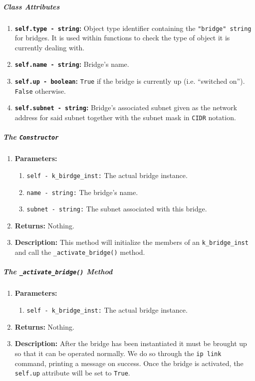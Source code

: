         \subparagraph{Class Attributes}
            \begin{enumerate}
                \item \textbf{\texttt{self.type - string}:} Object type identifier containing the \texttt{"bridge" string} for bridges. It is used within functions to check the type of object it is currently dealing with.
                \item \textbf{\texttt{self.name - string}:} Bridge's name.
                \item \textbf{\texttt{self.up - boolean}:} \texttt{True} if the bridge is currently up (i.e. ``switched on''). \texttt{False} otherwise.
                \item \textbf{\texttt{self.subnet - string}:} Bridge's associated subnet given as the network address for said subnet together with the subnet mask in \texttt{CIDR} notation.
            \end{enumerate}

        \subparagraph{The \texttt{Constructor}}
            \begin{enumerate}
                \item \textbf{Parameters:}
                \begin{enumerate}
                    \item \texttt{self - k\_birdge\_inst:} The actual bridge instance.
                    \item \texttt{name - string:} The bridge's name.
                    \item \texttt{subnet - string:} The subnet associated with this bridge.
                \end{enumerate}
                \item \textbf{Returns:} Nothing.
                \item \textbf{Description:} This method will initialize the members of an \texttt{k\_bridge\_inst} and call the \texttt{\_activate\_bridge()} method.
            \end{enumerate}

        \subparagraph{The \texttt{\_activate\_bridge()} Method}
            \begin{enumerate}
                \item \textbf{Parameters:}
                \begin{enumerate}
                    \item \texttt{self - k\_bridge\_inst:} The actual bridge instance.
                \end{enumerate}
                \item \textbf{Returns:} Nothing.
                \item \textbf{Description:} After the bridge has been instantiated it must be brought up so that it can be operated normally. We do so through the \texttt{ip link} command, printing a message on success. Once the bridge is activated, the \texttt{self.up} attribute will be set to \texttt{True}.
            \end{enumerate}

